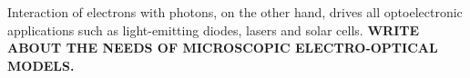 Interaction of electrons with photons, on the other hand, drives all optoelectronic applications such as light-emitting diodes, lasers and solar cells. 
\textbf{WRITE ABOUT THE NEEDS OF MICROSCOPIC ELECTRO-OPTICAL MODELS.}






